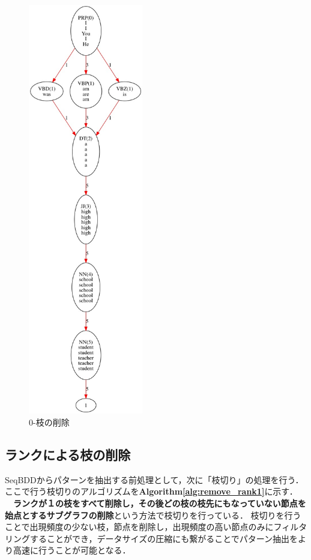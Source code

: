 \documentclass[12pt,twoside, fleqn]{ujbook}
\begin{document}
	\begin{figure}[htbp]
	\begin{center}
		\includegraphics [clip, width=5cm]{./img/remove_0-edge.jpeg}
		\caption{0-枝の削除}
		\label{fig:remove_0-edge}
	\end{center}
	\end{figure}

	\subsection{ランクによる枝の削除}
	SeqBDDからパターンを抽出する前処理として，次に「枝切り」の処理を行う．ここで行う枝切りのアルゴリズムを{\bf Algorithm\ref{alg:remove_rank1}}に示す．\\
	　{\bf ランクが１の枝をすべて削除し，その後どの枝の枝先にもなっていない節点を始点とするサブグラフの削除}という方法で枝切りを行っている．
	枝切りを行うことで出現頻度の少ない枝，節点を削除し，出現頻度の高い節点のみにフィルタリングすることができ，データサイズの圧縮にも繋がることでパターン抽出をより高速に行うことが可能となる．\\
	\\
\end{document}
